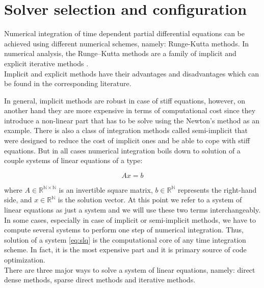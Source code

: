 \chapter{Solver selection and configuration}
\label{chapter:solver configuration}

Numerical integration of time dependent partial differential equations can be achieved using different numerical schemes, namely: Runge-Kutta methods. In numerical analysis, the Runge–Kutta methods are a family of implicit and explicit iterative methods \cite{wiki:runge-kutta}.  \\


Implicit and explicit methods have their advantages and disadvantages which can be found in the corresponding literature.

 In general, implicit methods are robust in case of stiff equations, however, on another hand they are more expensive in terms of computational cost since they introduce a non-linear part that has to be solve using the Newton's method as an example. There is also a class of integration methods called semi-implicit that were designed to reduce the cost of implicit ones and be able to cope with stiff equations. But in all cases numerical integration boils down to solution of a couple systems of linear equations of a type:

\begin{equation} \label{eq:slq}
	Ax = b
\end{equation}

 where $A \in \mathbb{R^{N \times N}}$ is an invertible square matrix, $b \in \mathbb{R^{N}}$ represents the right-hand side, and $x \in \mathbb{R^{N}}$ is the solution vector. At this point we refer to a system of linear equations as just a system and we will use these two terms interchangeably. \\
 
In some cases, especially in case of implicit or semi-implicit methods, we have to compute several systems to perform one step of numerical integration. Thus, solution of a system \ref{eq:slq} is the computational core of any time integration scheme. In fact, it is the most expensive part and it is primary source of code optimization. \\ 

There are three major ways to solve a system of linear equations, namely: direct dense methods, sparse direct methods and iterative methods.\\

